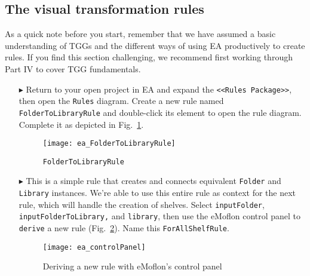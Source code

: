\newpage
\hypertarget{treeToModel vis}{}
\subsection{The visual transformation rules}
\genHeader

As a quick note before you start, remember that we have assumed a basic understanding of TGGs and the different ways of using EA productively to create rules.
If you find this section challenging, we recommend first working through Part IV to cover TGG fundamentals.

\begin{itemize}

\subsubsection{FolderToLibraryRule} %

\item[$\blacktriangleright$] Return to your open project in EA and expand the \texttt{<<Rules Package>>}, then open the \texttt{Rules} diagram.
Create a new rule named \texttt{Fol\-der\-To\-Lib\-rar\-y\-Rule} and double-click its element to open the rule diagram. Complete it as depicted in
Fig.~\ref{ea:FolderIntoLibrary_Complete}.

\vspace{0.5cm}

\begin{figure}[htbp]
\begin{center}
  \texttt{[image: ea\_FolderToLibraryRule]}
  \caption{\texttt{FolderToLibraryRule}}
  \label{ea:FolderIntoLibrary_Complete}
\end{center}
\end{figure}

\item[$\blacktriangleright$] This is a simple rule that creates and connects equivalent \texttt{Folder} and \texttt{Library} instances. We're able to use this
entire rule as context for the next rule, which will handle the creation of shelves. Select \texttt{inputFolder}, \texttt{in\-put\-Fol\-der\-To\-Lib\-rary,} and
\texttt{library}, then use the eMoflon control panel to \texttt{derive} a new rule (Fig.~\ref{ea:controlPanel}).
Name this \texttt{ForAllShelfRule}.

\vspace{0.5cm}

\begin{figure}[htbp]
\begin{center}
  \texttt{[image: ea\_controlPanel]}
  \caption{Deriving a new rule with eMoflon's control panel}
  \label{ea:controlPanel}
\end{center}
\end{figure}


\end{itemize}
